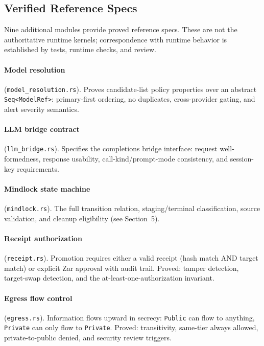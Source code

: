 \documentclass[11pt]{article}
\begin{document}
\subsection{Verified Reference Specs}
Nine additional modules provide proved reference specs. These are not the authoritative runtime kernels; correspondence with runtime behavior is established by tests, runtime checks, and review.

\paragraph{Model resolution} (\texttt{model\_resolution.rs}). Proves candidate-list policy properties over an abstract \texttt{Seq<ModelRef>}: primary-first ordering, no duplicates, cross-provider gating, and alert severity semantics.

\paragraph{LLM bridge contract} (\texttt{llm\_bridge.rs}). Specifies the completions bridge interface: request well-formedness, response usability, call-kind/prompt-mode consistency, and session-key requirements.

\paragraph{Mindlock state machine} (\texttt{mindlock.rs}). The full transition relation, staging/terminal classification, source validation, and cleanup eligibility (see Section~5).

\paragraph{Receipt authorization} (\texttt{receipt.rs}). Promotion requires either a valid receipt (hash match AND target match) or explicit Zar approval with audit trail. Proved: tamper detection, target-swap detection, and the at-least-one-authorization invariant.

\paragraph{Egress flow control} (\texttt{egress.rs}). Information flows upward in secrecy: \texttt{Public} can flow to anything, \texttt{Private} can only flow to \texttt{Private}. Proved: transitivity, same-tier always allowed, private-to-public denied, and security review triggers.
\end{document}
